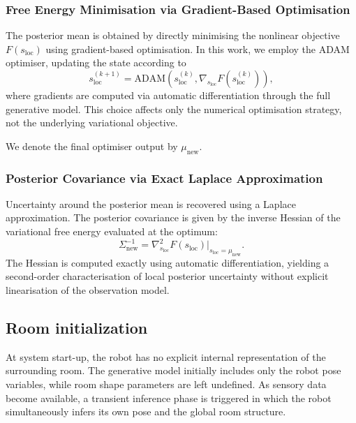 \documentclass[a4paper, twoside]{article}
\begin{document}
\subsubsection{Free Energy Minimisation via Gradient-Based Optimisation}
\label{sec:room-optimisation}

The posterior mean is obtained by directly minimising the nonlinear objective
$F(s_{\text{loc}})$ using gradient-based optimisation. In this work, we employ
the ADAM optimiser, updating the state according to
\begin{equation}
s_{\text{loc}}^{(k+1)}
=
\mathrm{ADAM}\!\left(
s_{\text{loc}}^{(k)},
\nabla_{s_{\text{loc}}}F(s_{\text{loc}}^{(k)})
\right),
\end{equation}
where gradients are computed via automatic differentiation through the full
generative model. This choice affects only the numerical optimisation strategy,
not the underlying variational objective.

We denote the final optimiser output by $\mu_{\text{new}}$.


\subsubsection{Posterior Covariance via Exact Laplace Approximation}
\label{sec:room-covariance}

Uncertainty around the posterior mean is recovered using a Laplace approximation.
The posterior covariance is given by the inverse Hessian of the variational free
energy evaluated at the optimum:
\begin{equation}
\Sigma_{\text{new}}^{-1}
=
\nabla^2_{s_{\text{loc}}} F(s_{\text{loc}})
\big|_{s_{\text{loc}}=\mu_{\text{new}}}.
\end{equation}
The Hessian is computed exactly using automatic differentiation, yielding a
second-order characterisation of local posterior uncertainty without explicit
linearisation of the observation model.

\subsection{Room initialization}
\label{sec:room_initialization}

At system start-up, the robot has no explicit internal representation of the surrounding room. The generative model initially includes only the robot pose variables, while room shape parameters are left undefined. As sensory data become available, a transient inference phase is triggered in which the robot simultaneously infers its own pose and the global room structure.
\end{document}

